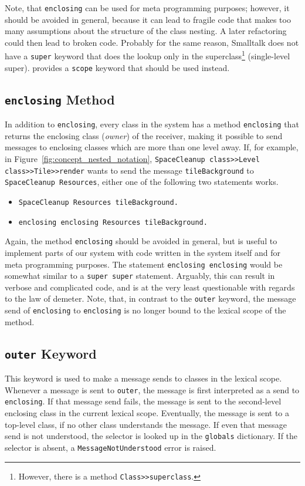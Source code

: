 Note, that \texttt{enclosing} can be used for meta programming purposes; however, it should be avoided in general, because it can lead to fragile code that makes too many assumptions about the structure of the class nesting. A later refactoring could then lead to broken code. Probably for the same reason, Smalltalk does not have a \texttt{super} keyword that does the lookup only in the superclass\footnote{However, there is a method \texttt{Class>>superclass}.} (single-level super). \msname provides a \texttt{scope} keyword that should be used instead.

\subsection{\texttt{enclosing} Method}
In addition to \texttt{enclosing}, every class in the system has a method \texttt{enclosing} that returns the enclosing class (\emph{owner}) of the receiver, making it possible to send messages to enclosing classes which are more than one level away. If, for example, in Figure~\ref{fig:concept_nested_notation}, \texttt{SpaceCleanup class>>Level class>>Tile>>render} wants to send the message \texttt{tileBackground} to \texttt{SpaceCleanup Resources}, either one of the following two statements works.

\begin{itemize}
	\item \texttt{SpaceCleanup Resources tileBackground.}
	\item \texttt{enclosing enclosing Resources tileBackground.}
\end{itemize}

Again, the method \texttt{enclosing} should be avoided in general, but is useful to implement parts of our system with code written in the system itself and for meta programming purposes. The statement \texttt{enclosing enclosing} would be somewhat similar to a \texttt{super super} statement. Arguably, this can result in verbose and complicated code, and is at the very least questionable with regards to the law of demeter. Note, that, in contrast to the \texttt{outer} keyword, the message send of \texttt{enclosing} to \texttt{enclosing} is no longer bound to the lexical scope of the method.

\subsection{\texttt{outer} Keyword}
\label{sec:concept_outer}
This keyword is used to make a message sends to classes in the lexical scope. Whenever a message is sent to \texttt{outer}, the message is first interpreted as a send to \texttt{enclosing}. If that message send fails, the message is sent to the second-level enclosing class in the current lexical scope. Eventually, the message is sent to a top-level class, if no other class understands the message. If even that message send is not understood, the selector is looked up in the \texttt{globals} dictionary. If the selector is absent, a \texttt{MessageNotUnderstood} error is raised.


